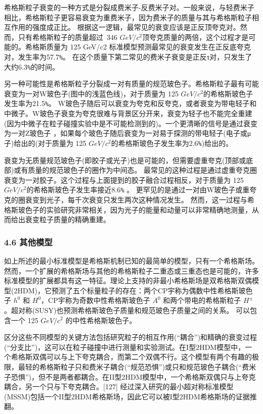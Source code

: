 希格斯粒子衰变的一种方式是分裂成费米子-反费米子对。一般来说，与轻费米子相比，希格斯粒子更容易衰变为重费米子，因为费米子的质量与其与希格斯粒子相互作用的强度成正比。 根据这一逻辑，最常见的衰变应该是正反顶夸克对。然而，只有希格斯粒子的质量超过~346 $GeV/c^2$顶夸克质量的两倍，这个过程才是可能的。希格斯质量为 125 GeV/c2 标准模型预测最常见的衰变发生在正反底夸克对，发生率为57.7\verb|%|。 在这个质量下第二常见的费米子衰变是正反τ对，只发生了大约6.3\verb|%|的时间。

另一种可能性是希格斯粒子分裂成一对有质量的规范玻色子。希格斯粒子最有可能衰变为一对W玻色子(图中的浅蓝色线)，对于质量为 125 $GeV/c^2$的希格斯玻色子发生率为21.5\verb|%|。 W玻色子随后可以衰变为夸克和反夸克，或者衰变为带电轻子和中微子。W玻色子衰变为夸克很难与背景区分开来，衰变为轻子也不能完全重建(因为中微子在粒子碰撞实验中是不可能检测到的)。一个更清晰的信号是通过衰变为一对Z玻色子 ，如果每个玻色子随后衰变为一对易于探测的带电轻子(电子或μ子)给出的(对于质量为 125 $GeV/c^2$的希格斯玻色子发生率为2.6\verb|%|)给出的。

衰变为无质量规范玻色子(即胶子或光子)也是可能的，但需要虚重夸克(顶部或底部)或有质量的规范玻色子的圈作为中间态。 最常见的这种过程是通过虚重夸克圈衰变为一对胶子。这个过程与上面提到的胶子融合过程相反，对于质量为 125 $GeV/c^2$的希格斯玻色子发生率接近8.6\verb|%| 。 更罕见的是通过一对由W玻色子或重夸克的圈衰变到光子，每千次衰变只发生两次这种情况发生。 然而，这一过程与希格斯玻色子的实验研究非常相关，因为光子的能量和动量可以非常精确地测量，从而给出衰变粒子质量的精确重建。

\subsubsection{4.6 其他模型}

如上所述的最小标准模型是希格斯机制已知的最简单的模型，只有一个希格斯场。然而，一个扩展的希格斯场与其他的希格斯粒子二重态或三重态也是可能的，许多标准模型的扩展都具有这一特征。理论上支持的非最小希格斯场是双希格斯双偶模型(2HDM)，它预测了五个标量粒子的存在：两个CP宇称为偶数中性希格斯玻色子 $h^0$ 和 $H^0$，CP宇称为奇数中性希格斯玻色子 $A^0$ 和两个带电的希格斯粒子 $H^{\pm}$ 。超对称(SUSY)也预测希格斯玻色子质量和规范玻色子质量之间的关系。 可以包含一个 125 $GeV/c^2$ 的中性希格斯玻色子。

区分这些不同模型的关键方法包括研究粒子的相互作用(“耦合”)和精确的衰变过程(“分支比”)，这可以在粒子碰撞中进行测量和实验测试。在I型2HDM模型中，一个希格斯双偶可以与上下夸克耦合，而第二个双偶不行。这个模型有两个有趣的极限，最轻的希格斯粒子只和费米子耦合(“规范恐惧”)或只和规范玻色子耦合(“费米子恐惧”)，但不是两者都耦合。在II型2HDM模型中，一个希格斯双偶只与上夸克耦合，另一个只与下夸克耦合。[127] 经过深入研究的最小超对称标准模型(MSSM)包括一个II型2HDM希格斯场，因此它可以被I型2HDM希格斯场的证据推翻。

